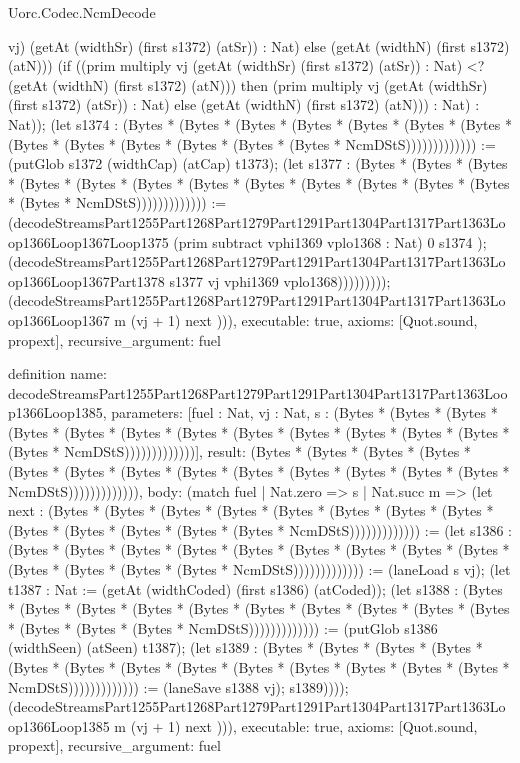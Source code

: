 \begin{lexlean}{Uorc.Codec.NcmDecode}
\begin{semanticmodule}
{vj) (getAt (widthSr) (first s1372) (atSr)) : Nat) else (getAt (widthN) (first s1372) (atN))) (if ((prim multiply vj (getAt (widthSr) (first s1372) (atSr)) : Nat) <? (getAt (widthN) (first s1372) (atN))) then (prim multiply vj (getAt (widthSr) (first s1372) (atSr)) : Nat) else (getAt (widthN) (first s1372) (atN))) : Nat) : Nat)); (let s1374 : (Bytes * (Bytes * (Bytes * (Bytes * (Bytes * (Bytes * (Bytes * (Bytes * (Bytes * (Bytes * (Bytes * (Bytes * (Bytes * NcmDStS))))))))))))) := (putGlob s1372 (widthCap) (atCap) t1373); (let s1377 : (Bytes * (Bytes * (Bytes * (Bytes * (Bytes * (Bytes * (Bytes * (Bytes * (Bytes * (Bytes * (Bytes * (Bytes * (Bytes * NcmDStS))))))))))))) := (decodeStreamsPart1255Part1268Part1279Part1291Part1304Part1317Part1363Loop1366Loop1367Loop1375 (prim subtract vphi1369 vplo1368 : Nat) 0 s1374 ); (decodeStreamsPart1255Part1268Part1279Part1291Part1304Part1317Part1363Loop1366Loop1367Part1378 s1377 vj vphi1369 vplo1368))))))))); (decodeStreamsPart1255Part1268Part1279Part1291Part1304Part1317Part1363Loop1366Loop1367 m (vj + 1) next ))),
  executable: true,
  axioms: [Quot.sound, propext],
  recursive_argument: fuel
}

definition{
  name: decodeStreamsPart1255Part1268Part1279Part1291Part1304Part1317Part1363Loop1366Loop1385,
  parameters: [fuel : Nat, vj : Nat, s : (Bytes * (Bytes * (Bytes * (Bytes * (Bytes * (Bytes * (Bytes * (Bytes * (Bytes * (Bytes * (Bytes * (Bytes * (Bytes * NcmDStS)))))))))))))],
  result: (Bytes * (Bytes * (Bytes * (Bytes * (Bytes * (Bytes * (Bytes * (Bytes * (Bytes * (Bytes * (Bytes * (Bytes * (Bytes * NcmDStS))))))))))))),
  body: (match fuel
    | Nat.zero => s
    | Nat.succ m => (let next : (Bytes * (Bytes * (Bytes * (Bytes * (Bytes * (Bytes * (Bytes * (Bytes * (Bytes * (Bytes * (Bytes * (Bytes * (Bytes * NcmDStS))))))))))))) := (let s1386 : (Bytes * (Bytes * (Bytes * (Bytes * (Bytes * (Bytes * (Bytes * (Bytes * (Bytes * (Bytes * (Bytes * (Bytes * (Bytes * NcmDStS))))))))))))) := (laneLoad s vj); (let t1387 : Nat := (getAt (widthCoded) (first s1386) (atCoded)); (let s1388 : (Bytes * (Bytes * (Bytes * (Bytes * (Bytes * (Bytes * (Bytes * (Bytes * (Bytes * (Bytes * (Bytes * (Bytes * (Bytes * NcmDStS))))))))))))) := (putGlob s1386 (widthSeen) (atSeen) t1387); (let s1389 : (Bytes * (Bytes * (Bytes * (Bytes * (Bytes * (Bytes * (Bytes * (Bytes * (Bytes * (Bytes * (Bytes * (Bytes * (Bytes * NcmDStS))))))))))))) := (laneSave s1388 vj); s1389)))); (decodeStreamsPart1255Part1268Part1279Part1291Part1304Part1317Part1363Loop1366Loop1385 m (vj + 1) next ))),
  executable: true,
  axioms: [Quot.sound, propext],
  recursive_argument: fuel
}


\end{semanticmodule}
\end{lexlean}

